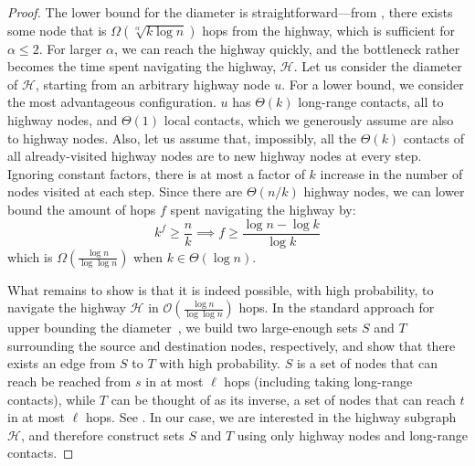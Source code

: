 \begin{proof}
    The lower bound for the diameter is straightforward---from
    , there exists some node that is
    $\Omega(\sqrt[\alpha]{k \log{n}})$ hops from the highway, which is
    sufficient for $\alpha \leq 2$.
    For larger $\alpha$, we can reach the highway quickly, and the bottleneck
    rather becomes the time spent navigating the highway, $\mathcal{H}$.
    Let us consider the diameter of $\mathcal{H}$, starting from an arbitrary
    highway node $u$. 
    For a lower bound, we consider the most advantageous configuration.
    $u$ has $\Theta(k)$ long-range contacts, all to highway nodes, and
    $\Theta(1)$ local contacts, which we generously assume are
    also to highway nodes.
    Also, let us assume that, impossibly, all the $\Theta(k)$ contacts of
    all already-visited highway nodes are to new highway nodes at every step.
    Ignoring constant factors, there is at most a factor of $k$ increase in the
    number of nodes visited at each step.
    Since there are $\Theta(n/k)$ highway nodes, we can lower bound the amount
    of hops $f$ spent navigating the highway by:
    \begin{equation*}
        k^f \geq \frac{n}{k} \implies f \geq \frac{\log{n} - \log{k}}{\log{k}}
    \end{equation*}
    which is $\Omega(\frac{\log{n}}{\log{\log{n}}})$ when $k \in
    \Theta(\log{n})$.

    What remains to show is that it is indeed possible, with high
    probability, to navigate the highway $\mathcal{H}$ in
    $\mathcal{O}(\frac{\log{n}}{\log{\log{n}}})$ hops.
    In the standard approach for upper bounding the diameter~\cite{martel}, we
    build two large-enough sets $S$ and $T$ surrounding the source and
    destination nodes, respectively, and show that there exists an edge from $S$
    to $T$ with high probability.
    $S$ is a set of nodes that can reach be reached from $s$
    in at most
    $\ell$ hops (including taking long-range contacts), while $T$ can be thought of as its inverse, a set
    of nodes that can reach $t$ in at most $\ell$ hops.
    See .
    In our case, we are interested in the highway subgraph $\mathcal{H}$, and
    therefore construct sets $S$ and $T$ using only highway nodes and
    long-range contacts.


\end{proof}
